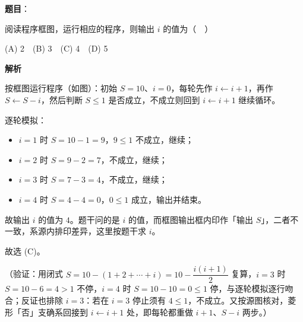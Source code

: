 \begin{answer}

\textbf{题目}：

阅读程序框图，运行相应的程序，则输出 \(i\) 的值为（　）
\nopagebreak[4]
\begin{center}\end{center}
\nopagebreak[4]
(A) 2　(B) 3　(C) 4　(D) 5

\textbf{解析}

按框图运行程序（如图）：初始 \(S=10\)、\(i=0\)，每轮先作 \(i\leftarrow i+1\)，再作 \(S\leftarrow S-i\)，然后判断 \(S\leqslant 1\) 是否成立，不成立则回到 \(i\leftarrow i+1\) 继续循环。

逐轮模拟：

\begin{itemize}
\item \(i=1\) 时 \(S=10-1=9\)，\(9\leqslant 1\) 不成立，继续；
\item \(i=2\) 时 \(S=9-2=7\)，不成立，继续；
\item \(i=3\) 时 \(S=7-3=4\)，不成立，继续；
\item \(i=4\) 时 \(S=4-4=0\)，\(0\leqslant 1\) 成立，输出并结束。
\end{itemize}

故输出 \(i\) 的值为 \(4\)。题干问的是 \(i\) 的值，而框图输出框内印作「输出 \(S\)」，二者不一致，系源内排印差异，这里按题干求 \(i\)。

故选 (C)。

（验证：用闭式 \(S=10-(1+2+\cdots+i)=10-\dfrac{i(i+1)}{2}\) 复算，\(i=3\) 时 \(S=10-6=4>1\) 不停，\(i=4\) 时 \(S=10-10=0\leqslant 1\) 停，与逐轮模拟逐行吻合；反证也排除 \(i=3\)：若在 \(i=3\) 停止须有 \(4\leqslant 1\)，不成立。又按源图核对，菱形「否」支确系回接到 \(i\leftarrow i+1\) 处，即每轮都重做 \(i+1\)、\(S-i\) 两步。）


\end{answer}
